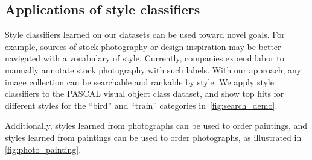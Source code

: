 
\subsection{Applications of style classifiers}

Style classifiers learned on our datasets can be used toward novel goals.
For example, sources of stock photography or design inspiration may be better navigated with a vocabulary of style.
Currently, companies expend labor to manually annotate stock photography with such labels.
With our approach, any image collection can be searchable and rankable by style.
We apply style classifiers to the PASCAL visual object class dataset, and show top hits for different styles for the ``bird'' and ``train'' categories in~\autoref{fig:search_demo}.

Additionally, styles learned from photographs can be used to order paintings, and styles learned from paintings can be used to order photographs, as illustrated in \autoref{fig:photo_painting}.
